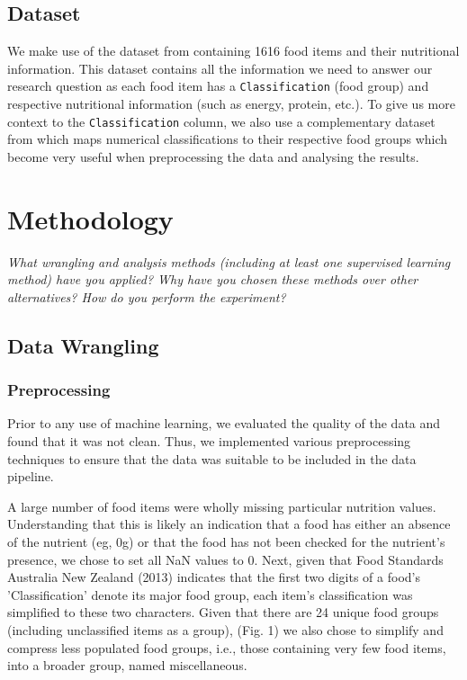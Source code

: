 \documentclass[11pt]{article}
\begin{document}
\subsection{Dataset}
We make use of the dataset from \cite{FoodStandardsAustraliaNewZealand} containing 1616 food items and their nutritional information. This dataset contains all the information we need to answer our research question as each food item has a \verb|Classification| (food group) and respective nutritional information (such as energy, protein, etc.). To give us more context to the \verb|Classification| column, we also use a complementary dataset from \cite{FoodClassification} which maps numerical classifications to their respective food groups which become very useful when preprocessing the data and analysing the results.

\section{Methodology}

\emph{What wrangling and analysis methods (including at least one supervised learning method) have you applied? Why have you chosen these methods over other alternatives? How do you perform the experiment?}

\subsection{Data Wrangling}

\subsubsection{Preprocessing}

Prior to any use of machine learning, we evaluated  the quality of the data and found that it was not clean. Thus, we implemented various preprocessing techniques to ensure that the data was suitable to be included in the data pipeline. 


A large number of food items were wholly missing particular nutrition values. Understanding that this is likely an indication that a food has either an absence of the nutrient (eg, 0g) or that the food has not been checked for the nutrient's presence, we chose to set all NaN values to 0. Next, given that Food Standards Australia New Zealand (2013) indicates that the first two digits of a food's 'Classification' denote its major food group, each item's classification was simplified to these two characters. Given that there are 24 unique food groups (including unclassified items as a group), (Fig. 1) we also chose to simplify and compress less populated food groups, i.e., those containing very few food items, into a broader group, named miscellaneous. 
\end{document}
